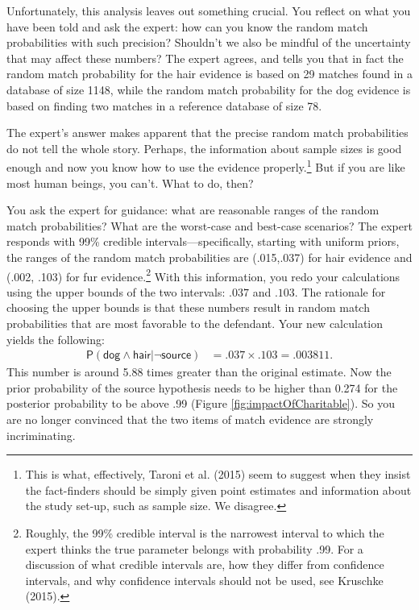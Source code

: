 \documentclass[
  10pt,
  dvipsnames,enabledeprecatedfontcommands]{scrartcl}
\newcommand{\s}[1]{\mbox{$\mathsf{#1}$}}
\begin{document}
Unfortunately, this analysis leaves out something crucial. You reflect
on what you have been told and ask the expert: how can you know the
random match probabilities with such precision? Shouldn't we also be
mindful of the uncertainty that may affect these numbers? The expert
agrees, and tells you that in fact the random match probability for the
hair evidence is based on 29 matches found in a database of size 1148,
while the random match probability for the dog evidence is based on
finding two matches in a reference database of size 78.

The expert's answer makes apparent that the precise random match
probabilities do not tell the whole story. Perhaps, the information
about sample sizes is good enough and now you know how
to
use the evidence properly.\footnote{This is what, effectively, Taroni et
  al. (2015) seem to suggest when they insist the fact-finders should be
  simply given point estimates and information about the study set-up,
  such as sample size. We disagree.} But if you are like most human
beings, you can't. What to do, then?

You ask the expert for guidance: what are reasonable ranges of the
random match probabilities? What are the worst-case and best-case
scenarios? The expert responds with 99\% credible
intervals---specifically, starting with uniform priors, the ranges of
the random match probabilities are (.015,.037) for hair evidence and
(.002, .103) for fur evidence.\footnote{Roughly, the 99\% credible
  interval is the narrowest interval to which the expert thinks the true
  parameter belongs with probability .99. For a discussion of what
  credible intervals are, how they differ from confidence intervals, and
  why confidence intervals should not be used, see Kruschke (2015).}
With this information, you redo your calculations using the upper bounds
of the two intervals: \(.037\) and \(.103\). The rationale for choosing
the upper bounds is that these numbers result in random match
probabilities that are most favorable to the defendant. Your new
calculation yields the following: \begin{align*}
\mathsf{P}(\s{dog}\wedge \s{hair} \vert \neg \s{source})   & =  .037 \times .103 =.003811.
\end{align*} This number is around 5.88 times greater than the original
estimate. Now the prior probability of the source hypothesis needs to be
higher than 0.274 for the posterior probability to be above .99 (Figure
\ref{fig:impactOfCharitable}). So you are no longer convinced that the
two items of match evidence are strongly incriminating.
\end{document}
